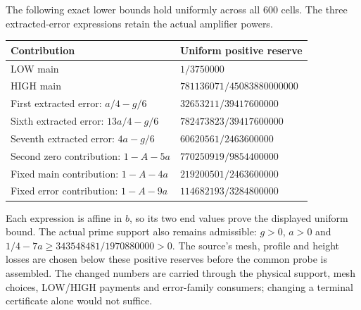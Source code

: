 \documentclass[10pt]{article}
\begin{document}
The following exact lower bounds hold uniformly across all 600 cells.
The three extracted-error expressions retain the actual amplifier powers.
\begin{center}
\begin{tabular}{ll}
\toprule
Contribution & Uniform positive reserve\\
\midrule
LOW main & $1/3750000$\\
HIGH main & $781136071/45083880000000$\\
First extracted error: $a/4-g/6$ & $32653211/39417600000$\\
Sixth extracted error: $13a/4-g/6$ & $782473823/39417600000$\\
Seventh extracted error: $4a-g/6$ & $60620561/2463600000$\\
Second zero contribution: $1-A-5a$ & $770250919/9854400000$\\
Fixed main contribution: $1-A-4a$ & $219200501/2463600000$\\
Fixed error contribution: $1-A-9a$ & $114682193/3284800000$\\
\bottomrule
\end{tabular}
\end{center}
Each expression is affine in $b$, so its two end values prove the displayed
uniform bound. The actual prime support also remains admissible: $g>0$,
$a>0$ and $1/4-7a\ge343548481/1970880000>0$.
The source's mesh, profile and height losses are chosen below these positive
reserves before the common probe is assembled. The changed numbers are carried
through the physical support, mesh choices, LOW/HIGH payments and error-family
consumers; changing a terminal certificate alone would not suffice.

\newpage
\end{document}
